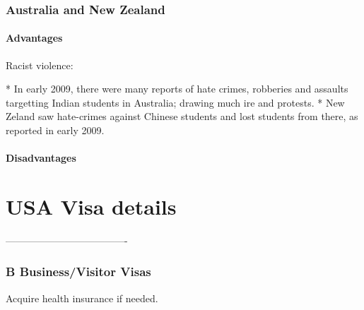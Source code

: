 \documentclass[oneside, article]{memoir}
\begin{document}
\section{Australia and New Zealand}
\subsection{Advantages}

Racist violence:

    * In early 2009, there were many reports of hate crimes, robberies and assaults targetting Indian students in Australia; drawing much ire and protests.
    * New Zeland saw hate-crimes against Chinese students and lost students from there, as reported in early 2009.

\subsection{Disadvantages}

\part{USA Visa details}
-------------------------------------
\section{B Business/Visitor Visas}
Acquire health insurance if needed.
\end{document}
